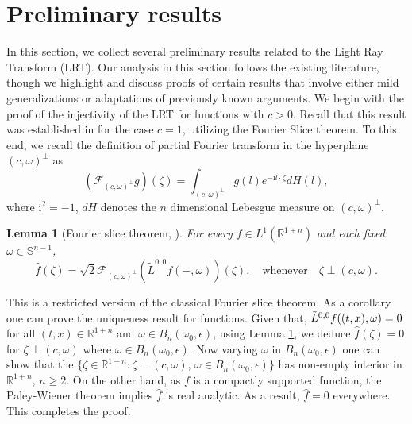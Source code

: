 \documentclass[11pt,a4paper,reqno]{amsart}
\newtheorem{lemma}[definition]{Lemma}
\renewcommand{\i}{\mathrm{i}}
\newcommand{\R}{\mathbb{R}}
\renewcommand{\S}{\mathbb{S}}
\newcommand{\F}{\mathcal{F}}
\newcommand{\om}{\omega}
\newcommand{\Rno}{\mathbb{R}^{1+n}}
\begin{document}
\section{Preliminary results} \label{sec2}

In this section, we collect several preliminary results related to the Light Ray Transform (LRT). Our analysis in this section follows the existing literature, though we highlight and discuss proofs of certain results that involve either mild generalizations or adaptations of previously known arguments.
We begin with the proof of the injectivity of the LRT for functions  with $c>0$. Recall that this result was established in \cite{stefanov1989inverse,ramm1991inverse} for the case $c=1$, utilizing the Fourier Slice theorem.
To this end, we  recall the definition of partial Fourier transform in the hyperplane $(c,\omega)^{\perp}$ as
	\[
	(\F_{(c,\omega)^{\perp}}g)(\zeta)=\int_{(c,\omega)^{\perp}}g(l)e^{-\i l\cdot \zeta }dH(l),
	\]
	where $\i^2=-1$, $dH$ denotes the $n$ dimensional Lebesgue measure on $(c,\omega)^{\perp}$.
	\begin{lemma}[Fourier slice theorem, \cite{ramm1991inverse}] \label{FST}
		For every $f \in L^{1}(\R^{1+n})$ and each fixed $\omega \in \S^{n-1}$, 
		\[
		\hat{f}(\zeta)=\sqrt{2}\F_{(c,\omega)^{\perp}}(\tilde{L}^{0,0}f(-,\omega))(\zeta), \quad\text{whenever}\quad \zeta \perp (c,\omega). 
		\]
	\end{lemma}
	This is a restricted version of the classical Fourier slice theorem. As a corollary one can prove the uniqueness result for functions.  Given that, $\Tilde{L}^{0,0}f((t,x),\omega)=0$ for all $(t,x)\in \mathbb{R}^{1+n}$ and $\omega \in B_{n}(\omega_0, \epsilon)$, using Lemma \ref{FST}, we deduce $\hat{f}(\zeta)=0$ for $\zeta \perp (c,\omega)$ where $\omega \in B_{n}(\omega_0, \epsilon)$. Now varying $\omega$ in $B_n(\omega_0, \epsilon)$ one can show that the  $\{\zeta \in \R^{1+n} : \zeta \perp (c,\om),\, \om \in B_n(\om_0,\epsilon)\}$ has non-empty interior in $\Rno$, $n\geq 2$.  On the other hand, as $f$ is a compactly supported function, the Paley-Wiener theorem implies $\hat{f}$ is real analytic. As a result, $\hat{f}=0$ everywhere. This completes the proof.
\end{document}
